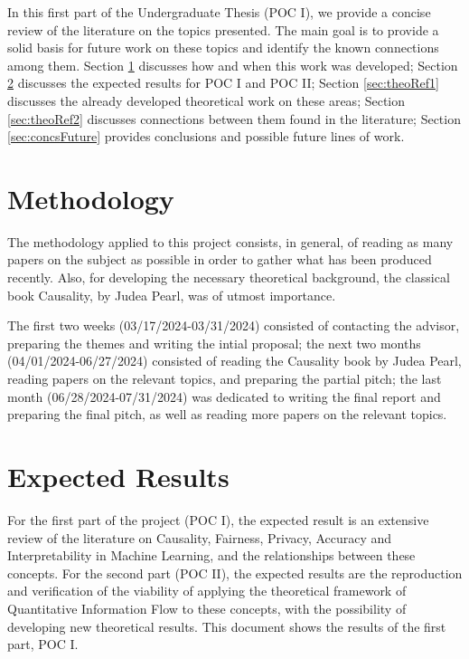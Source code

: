 \documentclass[conference]{IEEEtran}
\begin{document}
In this first part of the Undergraduate Thesis (POC I), we provide a concise review of the literature on the topics presented. The main goal is to provide a solid basis for future work on these topics and identify the known connections among them. Section \ref{sec:method} discusses how and when this work was developed; Section \ref{sec:expResults} discusses the expected results for POC I and POC II; Section \ref{sec:theoRef1} discusses the already developed theoretical work on these areas; Section \ref{sec:theoRef2} discusses connections between them found in the literature; Section \ref{sec:concsFuture} provides conclusions and possible future lines of work. 

\section{Methodology}\label{sec:method}

The methodology applied to this project consists, in general, of reading as many papers on the subject as possible in order to gather what has been produced recently. Also, for developing the necessary theoretical background, the classical book Causality\cite{Causality}, by Judea Pearl, was of utmost importance.

The first two weeks (03/17/2024-03/31/2024) consisted of contacting the advisor, preparing the themes and writing the intial proposal; the next two months (04/01/2024-06/27/2024) consisted of reading the Causality book by Judea Pearl, reading papers on the relevant topics, and preparing the partial pitch; the last month (06/28/2024-07/31/2024) was dedicated to writing the final report and preparing the final pitch, as well as reading more papers on the relevant topics.

\section{Expected Results}\label{sec:expResults}

For the first part of the project (POC I), the expected result is an extensive review of the literature on Causality, Fairness, Privacy, Accuracy and Interpretability in Machine Learning, and the relationships between these concepts. For the second part (POC II), the expected results are the reproduction and verification of the viability of applying the theoretical framework of Quantitative Information Flow to these concepts, with the possibility of developing new theoretical results. This document shows the results of the first part, POC I.
\end{document}
